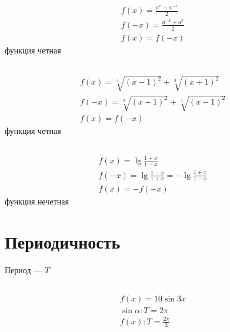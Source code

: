 \documentclass{article}
\begin{document}
\subsection{}

\begin{gather*}
	f(x) = \frac{a^x + a^{-x}}{2} \\
	f(-x) = \frac{a^{-x} + a^x}{2} \\
	f(x) = f(-x)
\end{gather*}
функция четная

\subsection{}

\begin{gather*}
	f(x) = \sqrt[3]{(x - 1)^2} + \sqrt[3]{(x + 1)^2} \\
	f(-x) = \sqrt[3]{(x + 1)^2} + \sqrt[3]{(x - 1)^2} \\
	f(x) = f(-x)
\end{gather*}
функция четная

\subsection{}

\begin{gather*}
	f(x) = \lg{\frac{1 + x}{1 - x}} \\
	f(-x) = \lg{\frac{1 - x}{1 + x}} = -\lg{\frac{1 + x}{1 - x}} \\
	f(x) = -f(-x)
\end{gather*}
функция нечетная

\section{Периодичность}

Период --- $T$

\subsection{}

\begin{gather*}
	f(x) = 10\sin{3x} \\
	\sin{\alpha}: T = 2\pi \\
	f(x): T = \frac{2\pi}{3}
\end{gather*}

\subsection{}
\end{document}
